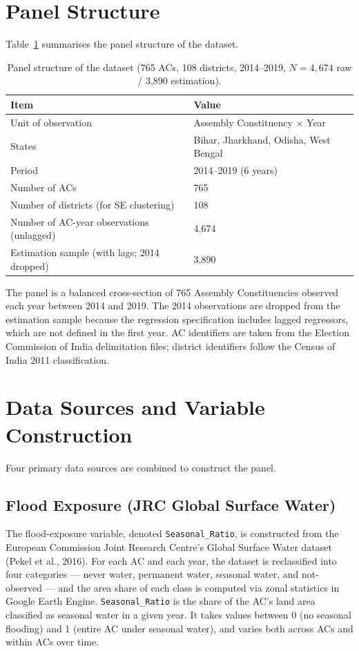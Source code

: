 \documentclass[12pt,a4paper,oneside]{report}
\begin{document}
\section{Panel Structure}
Table~\ref{tab:panel} summarises the panel structure of the dataset.

\begin{table}[h]
\centering
\caption{Panel structure of the dataset (765 ACs, 108 districts, 2014--2019, $N = 4{,}674$ raw / 3{,}890 estimation).}
\label{tab:panel}
\begin{tabular}{ll}
\toprule
\textbf{Item} & \textbf{Value} \\
\midrule
Unit of observation & Assembly Constituency $\times$ Year \\
States & Bihar, Jharkhand, Odisha, West Bengal \\
Period & 2014--2019 (6 years) \\
Number of ACs & 765 \\
Number of districts (for SE clustering) & 108 \\
Number of AC-year observations (unlagged) & 4{,}674 \\
Estimation sample (with lags; 2014 dropped) & 3{,}890 \\
\bottomrule
\end{tabular}
\end{table}

The panel is a balanced cross-section of 765 Assembly Constituencies observed each year between 2014 and 2019. The 2014 observations are dropped from the estimation sample because the regression specification includes lagged regressors, which are not defined in the first year. AC identifiers are taken from the Election Commission of India delimitation files; district identifiers follow the Census of India 2011 classification.

\section{Data Sources and Variable Construction}
Four primary data sources are combined to construct the panel.

\subsection{Flood Exposure (JRC Global Surface Water)}
The flood-exposure variable, denoted \texttt{Seasonal\_Ratio}, is constructed from the European Commission Joint Research Centre's Global Surface Water dataset (Pekel et al., 2016). For each AC and each year, the dataset is reclassified into four categories --- never water, permanent water, seasonal water, and not-observed --- and the area share of each class is computed via zonal statistics in Google Earth Engine. \texttt{Seasonal\_Ratio} is the share of the AC's land area classified as seasonal water in a given year. It takes values between 0 (no seasonal flooding) and 1 (entire AC under seasonal water), and varies both across ACs and within ACs over time.
\end{document}

